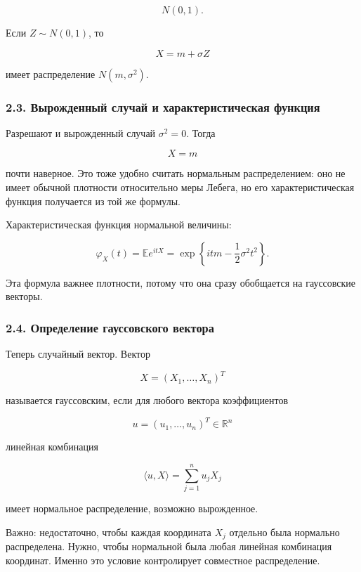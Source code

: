 \documentclass[
  11pt,
  a4paper,
]{article}
\begin{document}
\[
N(0,1).
\]

Если \(Z\sim N(0,1)\), то

\[
X=m+\sigma Z
\]

имеет распределение \(N(m,\sigma^2)\).

\subsubsection{2.3. Вырожденный случай и характеристическая
функция}\label{ux432ux44bux440ux43eux436ux434ux435ux43dux43dux44bux439-ux441ux43bux443ux447ux430ux439-ux438-ux445ux430ux440ux430ux43aux442ux435ux440ux438ux441ux442ux438ux447ux435ux441ux43aux430ux44f-ux444ux443ux43dux43aux446ux438ux44f}

Разрешают и вырожденный случай \(\sigma^2=0\). Тогда

\[
X=m
\]

почти наверное. Это тоже удобно считать нормальным распределением: оно
не имеет обычной плотности относительно меры Лебега, но его
характеристическая функция получается из той же формулы.

Характеристическая функция нормальной величины:

\[
\varphi_X(t)
=
\mathbb E e^{itX}
=
\exp\left\{itm-\frac12\sigma^2t^2\right\}.
\]

Эта формула важнее плотности, потому что она сразу обобщается на
гауссовские векторы.

\subsubsection{2.4. Определение гауссовского
вектора}\label{ux43eux43fux440ux435ux434ux435ux43bux435ux43dux438ux435-ux433ux430ux443ux441ux441ux43eux432ux441ux43aux43eux433ux43e-ux432ux435ux43aux442ux43eux440ux430}

Теперь случайный вектор. Вектор

\[
X=(X_1,\ldots,X_n)^T
\]

называется гауссовским, если для любого вектора коэффициентов

\[
u=(u_1,\ldots,u_n)^T\in\mathbb R^n
\]

линейная комбинация

\[
\langle u,X\rangle
=
\sum_{j=1}^n u_jX_j
\]

имеет нормальное распределение, возможно вырожденное.

Важно: недостаточно, чтобы каждая координата \(X_j\) отдельно была
нормально распределена. Нужно, чтобы нормальной была любая линейная
комбинация координат. Именно это условие контролирует совместное
распределение.
\end{document}
